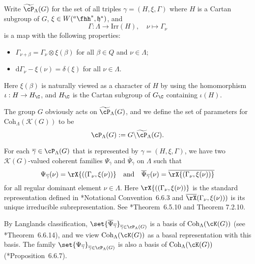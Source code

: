 \documentclass[12pt,a4paper]{amsart}
\newcommand{\CK}{{\mathcal {K}}}
\newcommand{\h}{\mathfrak h}
\numberwithin{equation}{section}
\theoremstyle{remark}
\def\Irr{\mathrm{Irr}}
\def\hha{{}^a\fhh}
\def\AND{\quad \text{and} \quad}
\def\Coh{\mathrm{Coh}}
\begin{document}
Write $\widetilde \cP_{\Lambda}(G)$ for the set of all triples $\gamma=(H, \xi, \Gamma)$ where $H$ is a Cartan subgroup of $G$, $\xi\in  W(\hha^*, \h^*)$, and
\[
\Gamma:   \Lambda\rightarrow \Irr(H), \quad \nu\mapsto \Gamma_\nu
\]
 is a map
with the following properties:
\begin{itemize}
  \item $\Gamma_{\nu+\beta}=\Gamma_\nu\otimes \xi(\beta)$ for all $\beta\in Q$ and $\nu\in \Lambda$;
  \item $\mathrm d  \Gamma_\nu- \xi(\nu)=\delta(\xi)$ for all $\nu\in  \Lambda$.
  \end{itemize}
Here $\xi(\beta)$ is naturally viewed as a character of $H$ by using the homomorphism $\iota: H\rightarrow H_\C$, and $H_\C$ is the Cartan subgroup of $G_\C$ containing $\iota(H)$.


\def\olgamma{\overline\gamma}
\def\olPsi{\overline\Psi}
\def\olrX{\overline\rX}

The group $G$ obviously acts on $\widetilde \cP_{\Lambda}(G)$, and we define the  set of parameters for $\Coh_{\Lambda}(\CK(G))$
to be \begin{equation}\label{eq:Pram}
  \cP_{\Lambda}(G) := G\backslash  \widetilde \cP_{\Lambda}(G).
\end{equation}



For each $\overline\gamma \in\cP_{\Lambda}(G)$ that is represented by $\gamma=(H, \xi, \Gamma)$, we  have two $\CK(G)$-valued coherent families  $\Psi_{\olgamma}$ and $\olPsi_{\olgamma}$ on $\Lambda$  such that
\begin{equation}\label{eq:psigamma}
  \Psi_{\olgamma}(\nu)=\rX{((\Gamma_\nu,\xi(\nu))}
  \AND
  \olPsi_{\olgamma}(\nu)=\olrX{(\Gamma_\nu,\xi(\nu))}
\end{equation}
for all  regular dominant element $\nu\in \Lambda$.
Here $\rX{((\Gamma_\nu,\xi(\nu))}$ is the standard representation defined in \cite{Vg}*{Notational
  Convention~6.6.3}  and  $\olrX(\Gamma_\nu,\xi(\nu)))$ is its unique irreducible subrepresentation. See
\cite{Vg}*{Theorem~6.5.10 and Theorem 7.2.10}.

By Langlands classification,
$\set{\olPsi_{\olgamma}}_{\olgamma\in \cP_{\Lambda}(G)}$ is a basis of
$\Coh_{\Lambda}(\cK(G))$   (see \cite{Vg}*{Theorem~6.6.14}), and we view $\Coh_\Lambda(\cK(G))$ as a basal representation with this basis. %
The family  $\set{\Psi_{\olgamma}}_{\olgamma\in \cP_{\Lambda}(G)}$ is also a basis of $\Coh_{\Lambda}(\cK(G))$ (\cite{Vg}*{Proposition~6.6.7}).
\end{document}
